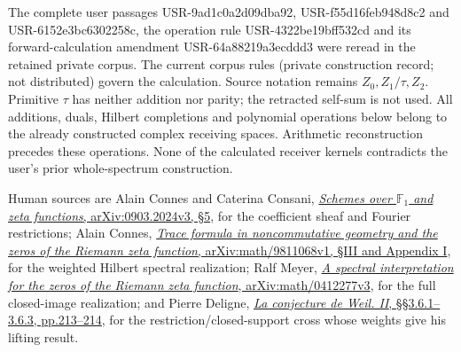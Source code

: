 The complete user passages USR-9ad1c0a2d09dba92, USR-f55d16feb948d8c2
and USR-6152e3bc6302258c, the operation rule USR-4322be19bff532cd and
its forward-calculation amendment USR-64a88219a3ecddd3 were reread in
the retained private corpus. The current corpus rules (private
construction record; not distributed) govern the calculation. Source
notation remains \(Z_0,Z_1/\tau,Z_2\). Primitive \(\tau\) has neither
addition nor parity; the retracted self-sum is not used. All additions,
duals, Hilbert completions and polynomial operations below belong to the
already constructed complex receiving spaces. Arithmetic reconstruction
precedes these operations. None of the calculated receiver kernels
contradicts the user's prior whole-spectrum construction.

Human sources are Alain Connes and Caterina Consani,
\href{https://arxiv.org/abs/0903.2024v3}{\emph{Schemes over
\(\mathbb F_1\) and zeta functions}, arXiv:0903.2024v3, §5}, for the
coefficient sheaf and Fourier restrictions; Alain Connes,
\href{https://arxiv.org/abs/math/9811068v1}{\emph{Trace formula in
noncommutative geometry and the zeros of the Riemann zeta function},
arXiv:math/9811068v1, §III and Appendix I}, for the weighted Hilbert
spectral realization; Ralf Meyer,
\href{https://arxiv.org/abs/math/0412277v3}{\emph{A spectral
interpretation for the zeros of the Riemann zeta function},
arXiv:math/0412277v3}, for the full closed-image realization; and Pierre
Deligne,
\href{https://www.numdam.org/item/PMIHES_1980__52__137_0/}{\emph{La
conjecture de Weil. II}, §§3.6.1--3.6.3, pp.213--214}, for the
restriction/closed-support cross whose weights give his lifting result.

